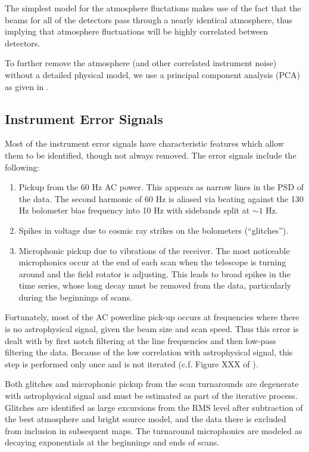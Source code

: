 \documentclass[12pt,preprint]{aastex}
\begin{document}
The simplest model for the atmosphere fluctations makes use of the
fact that the beams for all of the detectors pass through a nearly
identical atmosphere, thus implying that atmosphere fluctuations will
be highly correlated between detectors.

To further remove the atmosphere (and other correlated instrument
noise) without a detailed physical model, we use a principal component
analysis (PCA) as given in \citet{laurent05}.


\subsection{Instrument Error Signals}

Most of the instrument error signals have characteristic features
which allow them to be identified, though not always removed.  The
error signals include the following:
\begin{enumerate}

\item Pickup from the 60 Hz AC power.  This appears as narrow lines in
the PSD of the data.  The second harmonic of 60 Hz is aliased via
beating against the 130 Hz bolometer bias frequency into 10 Hz with
sidebands split at $\sim1$ Hz.

\item Spikes in voltage due to cosmic ray strikes on the bolometers
(``glitches'').

\item Microphonic pickup due to vibrations of the receiver.  The most
noticeable microphonics occur at the end of each scan when the
telescope is turning around and the field rotator is adjusting.  This
leads to broad spikes in the time series, whose long decay must be
removed from the data, particularly during the beginnings of scans.


\end{enumerate}

Fortunately, most of the AC powerline pick-up occurs at frequencies
where there is no astrophysical signal, given the beam size and scan
speed.  Thus this error is dealt with by first notch filtering at the
line frequencies and then low-pass filtering the data.  Because of the
low correlation with astrophysical signal, this step is performed only
once and is not iterated (c.f. Figure XXX of \citet{sayers09}).

Both glitches and microphonic pickup from the scan turnarounds are
degenerate with astrophysical signal and must be estimated as part of
the iterative process.  Glitches are identified as large excursions
from the RMS level after subtraction of the best atmosphere and bright
source model, and the data there is excluded from inclusion in
subsequent maps.  The turnaround microphonics are modeled as decaying
exponentials at the beginnings and ends of scans.
\end{document}
